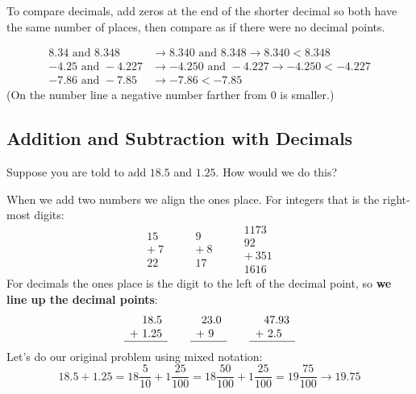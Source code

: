 \documentclass[letter]{article}
\newenvironment{keybox}
  {\begin{lrbox}{\keyboxsave}\begin{minipage}{\dimexpr\linewidth-2\fboxsep-2\fboxrule\relax}}
  {\end{minipage}\end{lrbox}\par\noindent\fbox{\usebox{\keyboxsave}}\par}
\begin{document}
\begin{keybox}
To compare decimals, add zeros at the end of the shorter decimal so both have the same number of places, then compare as if there were no decimal points.
\end{keybox}

\begin{align*}
8.34\text{ and }8.348&\to8.340\text{ and }8.348\to8.340<8.348\\
-4.25\text{ and }-4.227&\to-4.250\text{ and }-4.227\to-4.250<-4.227\\
-7.86\text{ and }-7.85&\to-7.86<-7.85
\end{align*}
(On the number line a negative number farther from $0$ is smaller.)

\subsection{Addition and Subtraction with Decimals}

Suppose you are told to add $18.5$ and $1.25$. How would we do this?

When we add two numbers we align the ones place. For integers that is the right-most digits:
\[
  \begin{array}{r}15\\+\ 7\\\hline22\end{array}\qquad
  \begin{array}{r}9\\+\ 8\\\hline17\end{array}\qquad
  \begin{array}{r}1173\\92\\+\ 351\\\hline1616\end{array}
\]
For decimals the ones place is the digit to the left of the decimal point, so \textbf{we line up the decimal points}:
\[
  \begin{array}{r}18.5\\+\ 1.25\\\hline\end{array}\qquad
  \begin{array}{r}23.0\\+\ 9\ \ \\\hline\end{array}\qquad
  \begin{array}{r}47.93\\+\ 2.5\ \ \\\hline\end{array}
\]
Let's do our original problem using mixed notation:
\[
  18.5+1.25=18\frac5{10}+1\frac{25}{100}=18\frac{50}{100}+1\frac{25}{100}=19\frac{75}{100}\to19.75
\]
\end{document}
